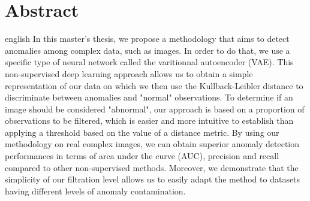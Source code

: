 \chapter*{Abstract}             %
\label{chap:abstract}           %

\begin{otherlanguage*}{english}
In this master's thesis, we propose a methodology that aims to detect anomalies among complex data, such as images. In order to do that, we use a specific type of neural network called the varitionnal autoencoder (VAE). This non-supervised deep learning approach allows us to obtain a simple representation of our data on which we then use the Kullback-Leibler distance to discriminate between anomalies and "normal" observations. To determine if an image should be considered "abnormal", our approach is based on a proportion of observations to be filtered, which is easier and more intuitive to establish than applying a threshold based on the value of a distance metric. By using our methodology on real complex images, we can obtain superior anomaly detection performances in terms of area under the curve (AUC), precision and recall compared to other non-supervised methods. Moreover, we demonstrate that the simplicity of our filtration level allows us to easily adapt the method to datasets having different levels of anomaly contamination.
\end{otherlanguage*}